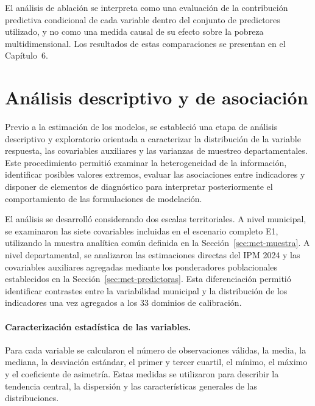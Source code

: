 El análisis de ablación se interpreta como una evaluación de la contribución predictiva condicional de cada variable dentro del conjunto de predictores utilizado, y no como una medida causal de su efecto sobre la pobreza multidimensional. Los resultados de estas comparaciones se presentan en el Capítulo~6.


\section{Análisis descriptivo y de asociación}
\label{sec:met-descriptivo}

Previo a la estimación de los modelos, se estableció una etapa de análisis descriptivo y exploratorio orientada a caracterizar la distribución de la variable respuesta, las covariables auxiliares y las varianzas de muestreo departamentales. Este procedimiento permitió examinar la heterogeneidad de la información, identificar posibles valores extremos, evaluar las asociaciones entre indicadores y disponer de elementos de diagnóstico para interpretar posteriormente el comportamiento de las formulaciones de modelación.

El análisis se desarrolló considerando dos escalas territoriales. A nivel municipal, se examinaron las siete covariables incluidas en el escenario completo E1, utilizando la muestra analítica común definida en la Sección~\ref{sec:met-muestra}. A nivel departamental, se analizaron las estimaciones directas del IPM 2024 y las covariables auxiliares agregadas mediante los ponderadores poblacionales establecidos en la Sección~\ref{sec:met-predictoras}. Esta diferenciación permitió identificar contrastes entre la variabilidad municipal y la distribución de los indicadores una vez agregados a los 33 dominios de calibración.

\paragraph{Caracterización estadística de las variables.}

Para cada variable se calcularon el número de observaciones válidas, la media, la mediana, la desviación estándar, el primer y tercer cuartil, el mínimo, el máximo y el coeficiente de asimetría. Estas medidas se utilizaron para describir la tendencia central, la dispersión y las características generales de las distribuciones.

